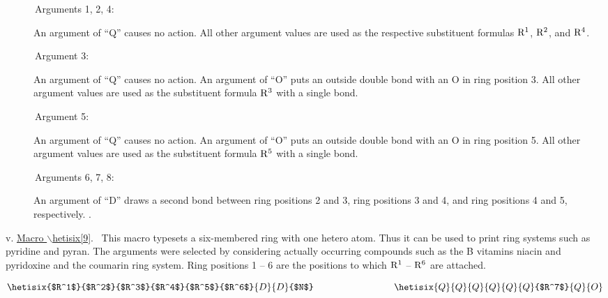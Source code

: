  \reinit
 \begin{description}
 \item[{\rm \ \ \ \ \ \ Arguments 1, 2, 4:}] An argument of ``Q''
      causes no action. All other argument values are used as
      the respective substituent formulas ${\rm R^1}$, ${\rm R^2}$,
      and ${\rm R^4}$.
 \item[{\rm \ \ \ \ \ \ Argument 3:}] An argument of ``Q'' causes
      no action. An argument of ``O'' puts an outside double
      bond with an O in ring position 3. All other argument
      values are used as the substituent formula ${\rm R^3}$
      with a single bond.
 \item[{\rm \ \ \ \ \ \ Argument 5:}] An argument of ``Q'' causes
      no action. An argument of ``O'' puts an outside double
      bond with an O in ring position 5. All other argument
      values are used as the substituent formula ${\rm R^5}$
      with a single bond.
 \item[{\rm \ \ \ \ \ \ Arguments 6, 7, 8:}] An argument of ``D''
      draws a second bond between ring positions 2 and 3,
      ring positions 3 and 4, and ring positions 4 and 5,
      respectively. \ri .
 \end{description}
  
 \vspace{\len mm}
 \indent v. \underline{Macro $\backslash $hetisix[9]}.
 \ This macro typesets a six-membered ring with one hetero
 atom. Thus it can be used to print ring systems such as
 pyridine and pyran. The arguments were selected by  
 considering actually occurring compounds such as the
 B vitamins niacin and pyridoxine and the coumarin ring
 system. Ring positions 1 -- 6 are the positions to which
 ${\rm R^1}$ -- ${\rm R^6}$ are attached.

 \[ \hetisix{$R^1$}{$R^2$}{$R^3$}{$R^4$}{$R^5$}{$R^6$}       
            {D}{D}{$N$}
    \hspace{3cm}
    \hetisix{Q}{Q}{Q}{Q}{Q}{Q}{$R^7$}{Q}{O}    \]

